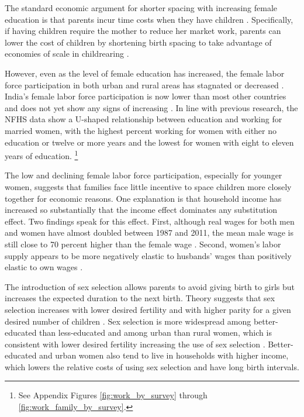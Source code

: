 \documentclass[12pt,letterpaper]{article}
\begin{document}

The standard economic argument for shorter spacing with increasing female education 
is that parents incur time costs when they have children \citep{Hotz1997,schultz97}.
Specifically, if having children require the mother to reduce her market work, parents 
can lower the cost of children by shortening birth spacing to 
take advantage of economies of scale in childrearing \citep{Vijverberg1982}.

However, even as the level of female education has increased, the female labor force 
participation in both urban and rural areas has stagnated or decreased
\citep{Klasen2015,Fletcher2017,Afridi2018,Bhargava2018,Chatterjee2018,Bhargava2019}.
India's female labor force participation is now lower than most other countries and does 
not yet show any signs of increasing \citep{Klasen2015,Chatterjee2018}.
In line with previous research, the NFHS data show a U-shaped relationship between 
education and working for married women, with the highest percent working for women with 
either no education or twelve or more years and the lowest for women with eight to 
eleven years of education.%
\footnote{
See Appendix Figures \ref{fig:work_by_survey} through \ref{fig:work_family_by_survey}. 
}

The low and declining female labor force participation, especially for younger women, 
suggests that families face little incentive to space children more closely 
together for economic reasons.
One explanation is that household income has increased so substantially that the income 
effect dominates any substitution effect.
Two findings speak for this effect.
First, although real wages for both men and women have almost doubled between 1987 and 
2011, the mean male wage is still close to 70 percent higher than the female wage 
\citep{Klasen2015,Bhargava2018}.
Second, women’s labor supply appears to be more negatively elastic to husbands' 
wages than positively elastic to own wages \citep{Bhargava2018}.



The introduction of sex selection allows parents to avoid giving birth to girls but 
increases the expected duration to the next birth.
Theory suggests that sex selection increases with lower desired fertility and with
higher parity for a given desired number of children \citep{Portner2015b}.
Sex selection is more widespread among better-educated than less-educated and among urban 
than rural women, which is consistent with lower desired fertility increasing the
use of sex selection 
\citep{das_gupta97,retherford03b,Guilmoto2009a,Portner2015b,Jayachandran2017}.
Better-educated and urban women also tend to live in households with higher income, which 
lowers the relative costs of using sex selection and have long birth intervals.
\end{document}
